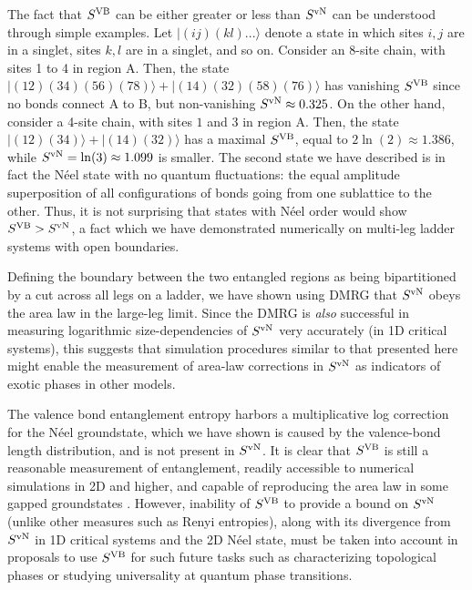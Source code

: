 \documentclass[prl,aps,twocolumn,floatfix,amsmath,amssymb,superscriptaddress,tightenlines]{revtex4}
\begin{document}
The fact  that $S^{\rm VB}$ can be either greater or less than $S^{ \rm
vN}$ can be understood through simple examples. Let $|(ij)(kl)...\rangle$
denote a state in which sites $i,j$ are in a singlet, sites $k,l$ are in a
singlet, and so on.  Consider an 8-site chain, with sites 1 to 4 in region
A. Then, the state $|(12)(34)(56)(78)\rangle+|(14)(32)(58)(76)\rangle$ has
vanishing $S^{\rm VB}$ since no bonds connect A to B, but
non-vanishing $S^{ \rm vN} \approx 0.325$.  On the other hand, consider a 4-site chain,
with sites $1$ and $3$ in region A. Then, the state
$|(12)(34)\rangle+|(14)(32)\rangle$ has a maximal $S^{\rm VB}$, equal to
$2\ln(2) \approx 1.386$, while $S^{ \rm vN} = \ln(3) \approx 1.099$ is smaller.  The second state we have
described is in fact the N\'eel state with no quantum fluctuations: the
equal amplitude superposition of all configurations of bonds going from
one sublattice to the other.  
Thus, it is not surprising that states with N\'eel order would show $S^{\rm VB} > S^{ \rm vN}$,
a fact which we have demonstrated numerically on multi-leg ladder systems with open boundaries.


Defining the boundary between the two entangled regions as being bipartitioned by a cut across all legs
on a ladder, we have shown using DMRG that $S^{ \rm vN}$ obeys the area law in the large-leg limit.   
Since the DMRG is {\it also} successful in measuring logarithmic size-dependencies of $S^{\rm vN}$ very accurately (in 1D critical systems), this suggests that simulation procedures similar to that presented here might enable the measurement of area-law corrections in $S^{\rm vN}$ as indicators of exotic phases in other models.

The valence bond entanglement entropy harbors a multiplicative log correction \cite{Alet,Chh} for the N\'eel groundstate, which we have shown is caused by the valence-bond length distribution, and is not present in $S^{\rm vN}$.  It is clear that $S^{\rm VB}$ is still a reasonable measurement of entanglement, readily accessible to numerical simulations in 2D and higher, and capable of reproducing the area law in some gapped groundstates \cite{Alet,Chh}.  However, inability of  $S^{\rm VB}$ to provide a bound on 
$S^{\rm vN}$ (unlike other measures such as Renyi entropies), along with its divergence from $S^{\rm vN}$ in 1D critical systems and the 2D N\'eel state, must be taken into account in proposals to use $S^{\rm VB}$ for such future tasks such as characterizing topological phases 
 or studying universality at quantum phase transitions.
\end{document}
